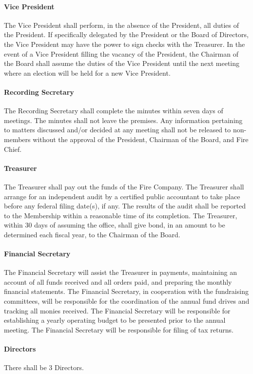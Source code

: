 ﻿\documentclass[12pt,letterpaper]{article}
\begin{document}
\paragraph{Vice President}
The Vice President shall perform, in the absence of the President, all duties of the President.  If specifically delegated by the President or the Board of Directors, the Vice President may have the power to sign checks with the Treasurer.  In the event of a Vice President filling the vacancy of the President, the Chairman of the Board shall assume the duties of the Vice President until the next meeting where an election will be held for a new Vice President.
\paragraph{Recording Secretary}
The Recording Secretary shall complete the minutes within seven days of meetings. The minutes shall not leave the premises.  Any information pertaining to matters discussed and/or decided at any meeting shall not be released to non-members without the approval of the President, Chairman of the Board, and Fire Chief.
\paragraph{Treasurer}
The Treasurer shall pay out the funds of the Fire Company.  The Treasurer shall arrange for an independent audit by a certified public accountant to take place before any federal filing date(s), if any. The results of the audit shall be reported to the Membership within a reasonable time of its completion. The Treasurer, within 30 days of assuming the office, shall give bond, in an amount to be determined each fiscal year, to the Chairman of the Board.
\paragraph{Financial Secretary}
The Financial Secretary will assist the Treasurer in payments, maintaining an account of all funds received and all orders paid, and preparing the monthly financial statements.  The Financial Secretary, in cooperation with the fundraising committees, will be responsible for the coordination of the annual fund drives and tracking all monies received.  The Financial Secretary will be responsible for establishing a yearly operating budget to be presented prior to the annual meeting.  The Financial Secretary will be responsible for filing of tax returns.
\paragraph{Directors}
There shall be 3 Directors.
\end{document}

